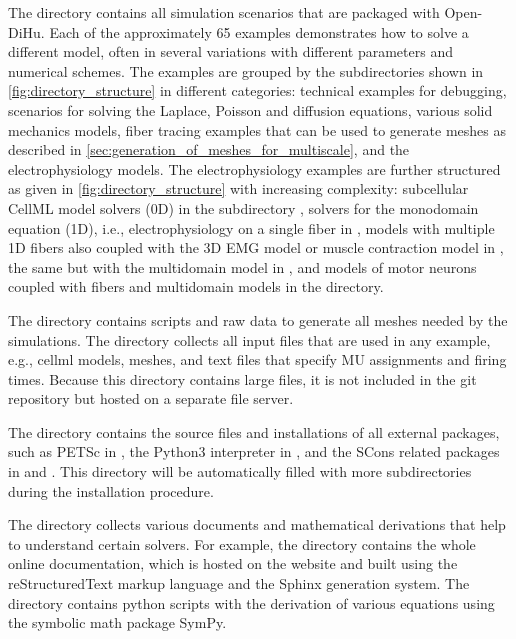The  directory contains all simulation scenarios that are packaged with Open-\break DiHu. Each of the approximately 65 examples demonstrates how to solve a different model, often in several variations with different parameters and numerical schemes. 
The examples are grouped by the subdirectories shown in \cref{fig:directory_structure} in different categories: technical examples for debugging, scenarios for solving the Laplace, Poisson and diffusion equations, various solid mechanics models, fiber tracing examples that can be used to generate meshes as described in \cref{sec:generation_of_meshes_for_multiscale}, and the electrophysiology models. 
The electrophysiology examples are further structured as given in \cref{fig:directory_structure} with increasing complexity: 
subcellular CellML model solvers (0D) in the subdirectory , 
solvers for the monodomain equation (1D), i.e., electrophysiology on a single fiber in , 
models with multiple 1D fibers also coupled with the 3D EMG model or muscle contraction model in , 
the same but with the multidomain model in , 
and models of motor neurons coupled with fibers and multidomain models in the  directory. 

The directory  contains scripts and raw data to generate all meshes needed by the simulations. The directory  collects all input files that are used in any example, e.g., cellml models, meshes, and text files that specify MU assignments and firing times. Because this directory contains large files, it is not included in the git repository but hosted on a separate file server.

The  directory contains the source files and installations of all external packages, such as PETSc in , the Python3 interpreter in , and the SCons related packages in  and . This directory will be automatically filled with more subdirectories during the installation procedure.

The  directory collects various documents and mathematical derivations that help to understand certain solvers. For example, the directory  contains the whole online documentation, which is hosted on the  website \cite{opendihuWeb} and built using the reStructuredText markup language and the Sphinx generation system. The  directory contains python scripts with the derivation of various equations using the symbolic math package SymPy.

